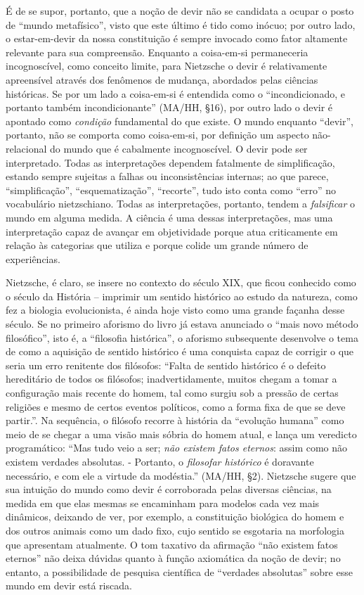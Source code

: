 \documentclass[
	12pt,				%
	openright,			%
	oneside,			%
	a4paper,			%
	english,			%
	french,				%
	spanish,			%
	brazil				%
	]{abntex2}
\begin{document}
É de se supor, portanto, que a noção de devir não se candidata a ocupar o posto de “mundo metafísico”, visto que este último é tido como inócuo; por outro lado, o estar-em-devir da nossa constituição é sempre invocado como fator altamente relevante para sua compreensão. Enquanto a coisa-em-si permaneceria incognoscível, como conceito limite, para Nietzsche o devir é relativamente apreensível através dos fenômenos de mudança, abordados pelas ciências históricas. Se por um lado a coisa-em-si é entendida como o “incondicionado, e portanto também incondicionante” (MA/HH, §16), por outro lado o devir é apontado como \textit{condição} fundamental do que existe. O mundo enquanto “devir”, portanto, não se comporta como coisa-em-si, por definição um aspecto não-relacional do mundo que é cabalmente incognoscível. O devir pode ser interpretado. Todas as interpretações dependem fatalmente de simplificação, estando sempre sujeitas a falhas ou  inconsistências internas; ao que parece, “simplificação”, “esquematização”, “recorte”, tudo isto conta como “erro” no vocabulário nietzschiano. Todas as interpretações, portanto, tendem a \textit{falsificar} o mundo em alguma medida. A ciência é uma dessas interpretações, mas uma interpretação capaz de avançar em objetividade porque atua criticamente em relação às categorias que utiliza e porque colide um grande número de experiências. 

Nietzsche, é claro, se insere no contexto do século XIX, que ficou conhecido como o século da História – imprimir um sentido histórico ao estudo da natureza, como fez a biologia evolucionista, é ainda hoje visto como uma grande façanha desse século. Se no primeiro aforismo do livro já estava anunciado o “mais novo método filosófico”, isto é, a “filosofia histórica”, o aforismo subsequente desenvolve o tema de como a aquisição de sentido histórico é uma conquista capaz de corrigir o que seria um erro renitente dos filósofos: “Falta de sentido histórico é o defeito hereditário de todos os filósofos; inadvertidamente, muitos chegam a tomar a configuração mais recente do homem, tal como surgiu sob a pressão de certas religiões e mesmo de certos eventos políticos, como a forma fixa de que se deve partir.”. Na sequência, o filósofo recorre à história da “evolução humana” como meio de se chegar a uma visão mais sóbria do homem atual, e lança um veredicto programático: “Mas tudo veio a ser; \textit{não existem fatos eternos}: assim como não existem verdades absolutas. - Portanto, o \textit{filosofar histórico} é doravante necessário, e com ele a virtude da modéstia.” (MA/HH, §2). Nietzsche sugere que sua intuição do mundo como devir é corroborada pelas diversas ciências, na medida em que elas mesmas se encaminham para modelos cada vez mais dinâmicos, deixando de ver, por exemplo, a constituição biológica do homem e dos outros animais como um dado fixo, cujo sentido se esgotaria na morfologia que apresentam atualmente. O tom taxativo da afirmação “não existem fatos eternos” não deixa dúvidas quanto à função axiomática da noção de devir; no entanto, a possibilidade de pesquisa científica de “verdades absolutas” sobre esse mundo em devir está riscada.
\end{document}
